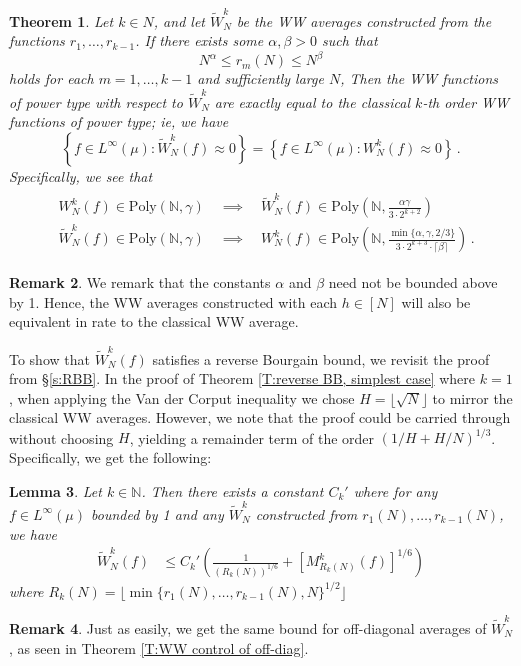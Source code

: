\documentclass[11pt, oneside]{amsart}   	%
\newcommand{\1}{\mathbbm{1}}
\newcommand{\N}{\mathbb{N}}
\newcommand{\floor}[1]{\lfloor#1\rfloor}
\newtheorem{theorem}{Theorem}[section]
\newtheorem{lemma}[theorem]{Lemma}
\theoremstyle{definition}
\newtheorem{remark}[theorem]{Remark}
\begin{document}
\begin{theorem}\label{T:Equivalence of WW averages}
Let $k\in N$, and let $\widetilde W_{N}^k$ be the WW averages constructed from the functions $r_1, \dots, r_{k-1}$. If there exists some $\alpha, \beta > 0$ such that
$$N^\alpha \leq r_m(N) \leq N^\beta$$
holds for each $m = 1, \dots, k-1$ and sufficiently large $N$, Then the WW functions of power type with respect to $\widetilde W_N^k$ are exactly equal to the classical $k$-th order WW functions of power type; ie, we have
$$\left\{ f\in L^\infty(\mu) : \widetilde W_N^k(f) \approx 0 \right\} = \left\{ f\in L^\infty(\mu) : W_N^k(f) \approx 0 \right\} \, .$$
Specifically, we see that
\begin{align}\label{F:alt WW comparisons, details}
\begin{split}
&W_N^k(f) \in \text{Poly}(\N, \gamma) \quad \implies \quad \widetilde W^k_N(f)\in \text{Poly}\left(\N, \frac{\alpha\gamma}{3 \cdot 2^{k+2}}\right) \\
&\widetilde W_N^k(f) \in \text{Poly}(\N, \gamma) \quad \implies \quad W^k_N(f)\in \text{Poly}\left(\N, \frac{\min\{\alpha,\gamma, 2/3\}}{3 \cdot 2^{k+3} \cdot \lceil \beta \rceil}\right) \, .
\end{split}
\end{align}
\end{theorem}
\begin{remark}
We remark that the constants $\alpha$ and $\beta$ need not be bounded above by 1. Hence, the WW averages constructed with each $h \in [N]$ will also be equivalent in rate to the classical WW average. 
\end{remark}




To show that $\widetilde{W}_N^k(f)$ satisfies a reverse Bourgain bound, we revisit the proof from \S \ref{s:RBB}. 
In the proof of Theorem \ref{T:reverse BB, simplest case} where $k=1$, when applying the Van der Corput inequality we chose $H=\floor{\sqrt{N}}$ to mirror the classical WW averages. However, we note that the proof could be carried through without choosing $H$, yielding a remainder term of the order $\left( 1/H + H/N\right)^{1/3}$. Specifically, we get the following:

\begin{lemma}\label{T:RBB for alt WW averages}
Let $k\in \N$. Then there exists a constant $C_k'$ where for any $f\in L^\infty(\mu)$ bounded by 1 and any $\widetilde W_N^k$ constructed from $r_1(N), \dots, r_{k-1}(N)$, we have 
\begin{align*}
\widetilde W_N^k(f) &\leq C_k'\left( \frac{1}{(R_k(N))^{1/6}} + \left[ M_{R_k(N)}^k (f)\right]^{1/6}\right) 
\end{align*}
where $R_k(N) = \floor{\min\{r_1(N), \dots, r_{k-1}(N), N\}^{1/2}}$
\end{lemma}
\begin{remark}
Just as easily, we get the same bound for off-diagonal averages of $\widetilde W_N^k$, as seen in Theorem \ref{T:WW control of off-diag}.
\end{remark}
\end{document}
